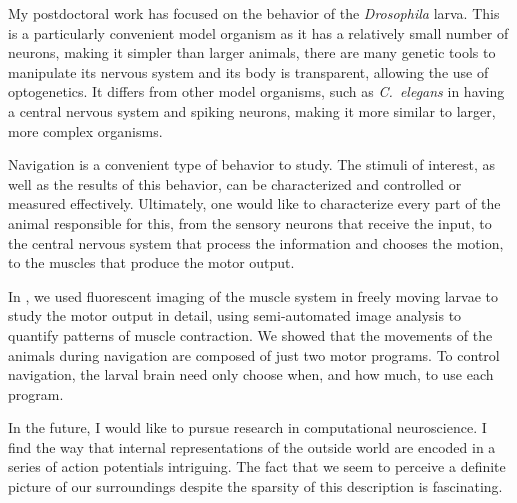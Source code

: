 \documentclass[10pt,oneside]{article}
\begin{document}


My postdoctoral work has focused on the behavior of the \emph{Drosophila} larva. This is a particularly convenient model organism as it has a relatively small number of neurons, making it simpler than larger animals, there are many genetic tools to manipulate its nervous system and its body is transparent, allowing the use of optogenetics. It differs from other model organisms, such as \emph{C.\ elegans} in having a central nervous system and spiking neurons, making it more similar to larger, more complex organisms.

Navigation is a convenient type of behavior to study. The stimuli of interest, as well as the results of this behavior, can be characterized and controlled or measured effectively. Ultimately, one would like to characterize every part of the animal responsible for this, from the sensory neurons that receive the input, to the central nervous system that process the information and chooses the motion, to the muscles that produce the motor output.

In \cite{Lahiri2011}, we used fluorescent imaging of the muscle system in freely moving larvae to study the motor output in detail, using semi-automated image analysis to quantify patterns of muscle contraction. We showed that the movements of the animals during navigation are composed of just two motor programs. To control navigation, the larval brain need only choose when, and how much, to use each program.


In the future, I would like to pursue research in computational neuroscience. I find the way that internal representations of the outside world are encoded in a series of action potentials intriguing. The fact that we seem to perceive a definite picture of our surroundings despite the sparsity of this description is fascinating.
\end{document}
